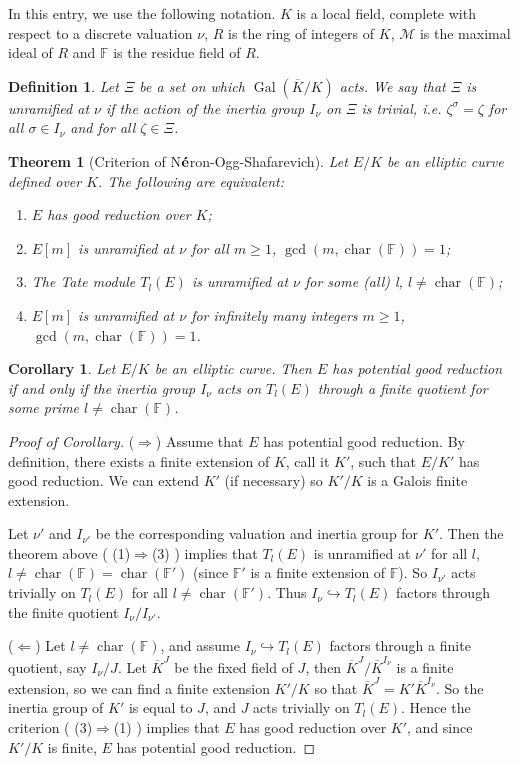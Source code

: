 \documentclass[12pt]{article}
\newtheorem*{thm}{Theorem}
\newtheorem*{defn}{Definition}
\newtheorem*{cor}{Corollary}
\theoremstyle{definition}
\newcommand{\Gal}{\operatorname{Gal}}
\newcommand{\M}{\mathcal{M}}
\newcommand{\ka}{\mathbb{F}}
\newcommand{\cara}{\operatorname{char}}
\begin{document}
In this entry, we use the following notation. $K$ is a local field, complete with respect to a
discrete valuation $\nu$, $R$ is the ring of integers of $K$, $\M$ is the maximal ideal of $R$ and $\ka$ is the residue field of $R$.
\begin{defn}
Let $\Xi$ be a set on which $\Gal(\overline{K}/K)$
acts. We say that $\Xi$ is unramified at $\nu$ if the action of the inertia group
${I_{\nu}}$ on $\Xi$ is trivial, i.e. ${\zeta}^{\sigma}=\zeta$
for all $\sigma \in I_{\nu}$ and for all $\zeta \in \Xi$.
\end{defn}
\begin{thm}[Criterion of N${\bf {\acute{e}}}$ron-Ogg-Shafarevich] Let $E/K$ be an elliptic curve defined over $K$. The following are
equivalent:
\begin{enumerate}
\item $E$ has good reduction over $K$;
\item $E[m]$ is unramified at $\nu$ for all $m\geq1$,
 $\gcd(m,\cara(\ka))=1$;
\item The Tate module $T_l(E)$ is unramified at $\nu$ for
some (all) l, $l\neq \cara(\ka)$;
\item $E[m]$ is unramified at $\nu$ for infinitely many
integers $m\geq 1$, $\gcd(m,\cara(\ka))=1$.
\end{enumerate}
\end{thm}
\begin{cor}
Let $E/K$ be an elliptic curve. Then $E$ has
potential good reduction if and only if the inertia group
$I_{\nu}$ acts on $T_l(E)$ through a finite quotient for some
prime $l\neq \cara(\ka)$.
\end{cor}
\begin{proof}[Proof of Corollary] ($\Rightarrow$) Assume that $E$ has potential good
reduction. By definition, there exists a finite extension of $K$, call it $K'$, such that $E/K'$ has good reduction. We
can extend 
$K'$ (if necessary) so $K'/K$ is a Galois finite extension.

Let $\nu'$ and $I_{\nu '}$ be the corresponding valuation
and inertia group for $K'$. Then the theorem above (
(1)$\Rightarrow$(3) ) implies that $T_l(E)$ is unramified at
$\nu'$ for all $l$, $l\neq \cara(\ka)=\cara(\ka')$ (since
$\ka'$ is a finite extension of $\ka$). So $I_{\nu '}$ acts
trivially on $T_l(E)$ for all $l\neq \cara(\ka')$. Thus
$I_{\nu}\hookrightarrow T_l(E)$ factors through the finite
quotient $I_{\nu}/I_{{\nu}'}$.


($\Leftarrow$) Let $l\neq \cara(\ka)$, and assume
$I_{\nu}\hookrightarrow T_l(E)$ factors through a finite quotient,
say $I_{\nu}/J$. Let ${\overline{K}}^J$ be the fixed field of
$J$, then ${\overline{K}}^J/{\overline{K}}^{I_{\nu}}$ is a finite extension, so we can find a finite
extension $K'/K$ so that ${\overline{K}}^J={K'}{\overline{K}}^{I_{\nu}}$. So 
the inertia group of $K'$ is equal to $J$, and
$J$ acts trivially on $T_l(E)$. Hence the criterion (
(3)$\Rightarrow$(1) ) implies that $E$ has good reduction over
$K'$, and since $K'/K$ is finite, $E$ has
potential good reduction.
\end{proof}
\end{document}
